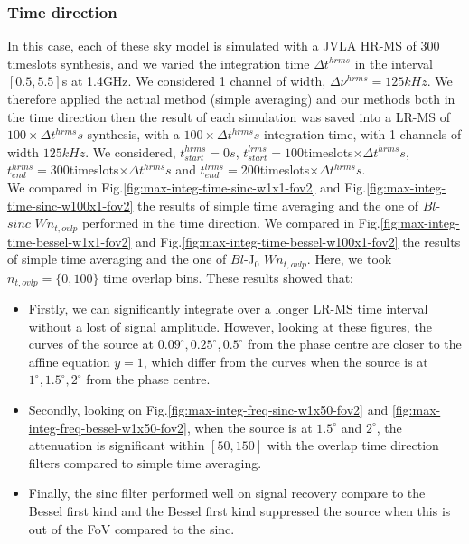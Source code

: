 \documentclass[useAMS,usenatbib]{mn2e}
\begin{document}
\subsubsection{Time direction}
In this case, each of these sky model is simulated with a JVLA HR-MS of $300$ timeslots synthesis, and we varied the integration time 
$\Delta t^{hrms}$ in the interval $[0.5,5.5]$s at 1.4GHz. We considered 1 channel of width, $\Delta \nu^{hrms}=125kHz$.   We 
therefore applied the actual method (simple averaging) and our methods both in the time direction then the result of each simulation was 
saved into a LR-MS of $100\times\Delta t^{hrms}s$ synthesis, with a $100\times\Delta t^{hrms}s$ integration time, with 1 channels of width 
$125kHz$. We considered, $t^{hrms}_{start}=0s$, $t^{lrms}_{start}=100$timeslots$\times\Delta t^{hrms} s$, 
$t^{hrms}_{end}=300$timeslots$\times\Delta t^{hrms}s$ and $t^{lrms}_{end}=200$timeslots$\times\Delta t^{hrms}s$.\\
We compared in Fig.\ref{fig:max-integ-time-sinc-w1x1-fov2} and Fig.\ref{fig:max-integ-time-sinc-w100x1-fov2}  the results of simple 
time averaging and the one of  $Bl$-$sinc$ $W n_{t,ovlp}$ performed in the time direction. We compared in 
Fig.\ref{fig:max-integ-time-bessel-w1x1-fov2} and Fig.\ref{fig:max-integ-time-bessel-w100x1-fov2} the results of simple time averaging 
and the one of  $Bl$-J$_0$ $W n_{t,ovlp}$. Here, we took $n_{t,ovlp}=\{0,100\}$ time overlap bins. These results 
showed that:
\begin{itemize}
 \item Firstly, we can significantly integrate over a longer LR-MS time interval without a lost of signal 
amplitude. However, looking at these figures, the curves of the source at $0.09^{\circ},0.25^{\circ},0.5^{\circ}$ from the phase centre are 
closer to the affine equation $y=1$, which differ from the curves when the source is at $1^{\circ},1.5^{\circ}, 2^{\circ}$ from the phase 
centre.  
 \item Secondly, looking on Fig.\ref{fig:max-integ-freq-sinc-w1x50-fov2} and 
\ref{fig:max-integ-freq-bessel-w1x50-fov2}, when the source is at $1.5^{\circ}$ and $2^{\circ}$, the attenuation is significant within 
$[50,150]$ with the overlap time direction filters compared to simple time averaging.
 \item Finally, the sinc filter performed well on signal recovery compare to the Bessel first kind and the Bessel first kind suppressed the 
source when this is out of the FoV compared to the sinc.  
\end{itemize}
\vspace{-0.5cm}
\end{document}
